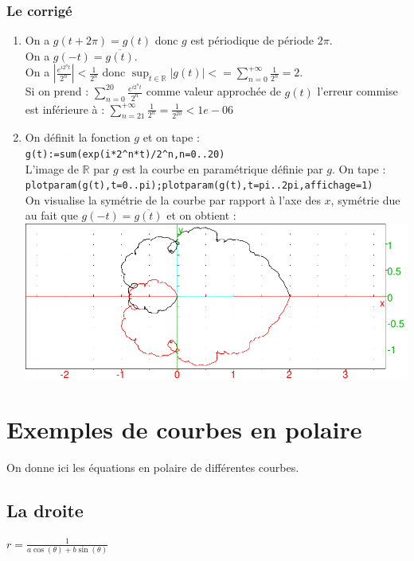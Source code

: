 \documentclass[a4paper,11pt]{book}
\newcommand{\R}{{\mathbb{R}}}
\begin{document}
\subsection{Le corrig\'e}
\begin{enumerate}
\item 
On a $g(t+2\pi)=g(t)$  donc $g$  est p\'eriodique de p\'eriode $2\pi$.\\
On a $g(-t)=\overline{g(t)}$.\\
On a $\displaystyle |\frac{e^{i2^nt}}{2^n}|<\frac{1}{2^n}$ donc 
$\displaystyle \sup_{t\in \R}|g(t)|<=\sum_{n=0}^{+\infty}\frac{1}{2^n}=2$.\\
Si on prend :
$\sum_{n=0}^{20}\frac{e^{i2^nt}}{2^n}$ comme valeur approch\'ee de $g(t)$
l'erreur commise est inf\'erieure \`a :
$\displaystyle \sum_{n=21}^{+\infty}\frac{1}{2^n}=\frac{1}{2^{20}}<1e-06$
\item On d\'efinit la fonction $g$ et on tape :\\
{\tt g(t):=sum(exp(i*2\verb|^|n*t)/2\verb|^|n,n=0..20)}\\
L'image de $\R$ par $g$ est la courbe en param\'etrique d\'efinie par $g$.
On tape :\\
{\tt plotparam(g(t),t=0..pi);plotparam(g(t),t=pi..2pi,affichage=1)}\\
On visualise la sym\'etrie de la courbe par rapport \`a l'axe des $x$, 
sym\'etrie due au fait que $g(-t)=\overline{g(t)}$ et on obtient :\\

\includegraphics[width=\textwidth]{exoparam} 
\end{enumerate}

\chapter{Exemples de courbes en polaire}
On donne ici les \'equations en polaire de diff\'erentes courbes.
\section{La droite}
$r=\displaystyle \frac{1}{a\cos(\theta)+b\sin(\theta)}$
\end{document}

